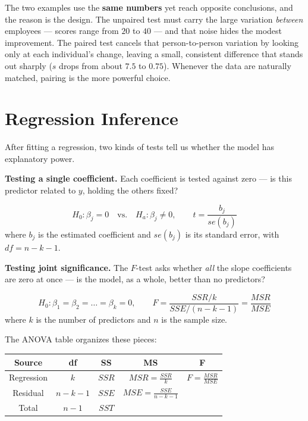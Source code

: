 \documentclass[
  11pt,
  letterpaper,
  DIV=11,
  numbers=noendperiod,
  oneside,
  open=any]{scrreprt}
\begin{document}
The two examples use the \textbf{same numbers} yet reach opposite
conclusions, and the reason is the design. The unpaired test must carry
the large variation \emph{between} employees --- scores range from
\(20\) to \(40\) --- and that noise hides the modest improvement. The
paired test cancels that person-to-person variation by looking only at
each individual's change, leaving a small, consistent difference that
stands out sharply (\(s\) drops from about \(7.5\) to \(0.75\)).
Whenever the data are naturally matched, pairing is the more powerful
choice.

\section{Regression Inference}\label{regression-inference}

After fitting a regression, two kinds of tests tell us whether the model
has explanatory power.

\textbf{Testing a single coefficient.} Each coefficient is tested
against zero --- is this predictor related to \(y\), holding the others
fixed?

\begin{bsformula}

\[H_0: \beta_j = 0 \quad\text{vs.}\quad H_a: \beta_j \ne 0, \qquad t = \frac{b_j}{se(b_j)}\]
where \(b_j\) is the estimated coefficient and \(se(b_j)\) is its
standard error, with \(df = n - k - 1\).

\end{bsformula}

\textbf{Testing joint significance.} The \(F\)-test asks whether
\emph{all} the slope coefficients are zero at once --- is the model, as
a whole, better than no predictors?

\begin{bsformula}

\[H_0: \beta_1 = \beta_2 = \dots = \beta_k = 0, \qquad F = \frac{SSR/k}{SSE/(n-k-1)} = \frac{MSR}{MSE}\]
where \(k\) is the number of predictors and \(n\) is the sample size.

\end{bsformula}

The ANOVA table organizes these pieces:

\begin{center}
\begin{tabular}{ccccc}
\toprule
Source & df & SS & MS & F \\
\midrule
Regression & \(k\) & \(SSR\) & \(MSR = \frac{SSR}{k}\) & \(F = \frac{MSR}{MSE}\) \\
Residual & \(n-k-1\) & \(SSE\) & \(MSE = \frac{SSE}{n-k-1}\) &  \\
Total & \(n-1\) & \(SST\) &  &  \\
\bottomrule
\end{tabular}
\end{center}
\end{document}

